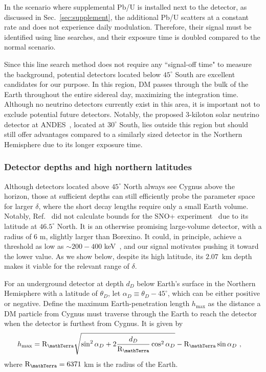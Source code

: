 \documentclass[aps,prd,amsmath,amssymb,10pt,letterpaper,balancelastpage,showpacs,superscriptaddress,nofootinbib,floatfix,notitlepage,longbibliography,twocolumn
]{revtex4-2}
\newcommand{\REarth}{\mathrm{R}_{\mathTerra}}
\newcommand{\hmax}{h_{\text{max}}}
\begin{document}
In the scenario where supplemental Pb/U is installed next to the detector, as discussed in Sec.~\ref{sec:supplement}, the additional Pb/U scatters at a constant rate and does not experience daily modulation. Therefore, their signal must be identified using line searches, and their exposure time is doubled compared to the normal scenario.

Since this line search method does not require any ``signal-off time" to measure the background, potential detectors located below $45^{\circ}$ South are excellent candidates for our purpose. In this region, DM passes through the bulk of the Earth throughout the entire sidereal day, maximizing the integration time. Although no neutrino detectors currently exist in this area, it is important not to exclude potential future detectors. Notably, the proposed 3-kiloton solar neutrino detector at ANDES~\cite{ANDES_neutrino, ANDES}, located at $30^\circ$ South, lies outside this region but should still offer advantages compared to a similarly sized detector in the Northern Hemisphere due to its longer exposure time.

\subsubsection{Detector depths and high northern latitudes}
Although detectors located above $45^\circ$ North always see Cygnus above the horizon, those at sufficient depths can still efficiently probe the parameter space for larger $\delta$, where the short decay lengths require only a small Earth volume. Notably, Ref.~\cite{Luminous} did not calculate bounds for the SNO+ experiment~\cite{SNO+} due to its latitude at $46.5^\circ$ North. It is an otherwise promising large-volume detector, with a radius of $6$ m, slightly larger than Borexino. It could, in principle, achieve a threshold as low as $\sim 200 - 400$ keV~\cite{SNO+Threshold}, and our signal motivates pushing it toward the lower value. As we show below, despite its high latitude, its $2.07$~km depth makes it viable for the relevant range of $\delta$.

For an underground detector at depth $d_D$ below Earth's surface in the Northern Hemisphere with a latitude of $\theta_{D}$, let $\alpha_D \equiv \theta_D-45^\circ$, which can be either positive or negative. Define the maximum Earth-penetration length $\hmax$ as the distance a DM particle from Cygnus must traverse through the Earth to reach the detector when the detector is furthest from Cygnus. It is given by
\begin{align} \label{eq: hmax}
    \hmax &= \REarth \sqrt{ \sin^2\alpha_D + 2 \frac{d_D}{\REarth} \cos^2 \alpha_D } - \REarth \sin\alpha_D ~,
\end{align}
where $\REarth=6371$ km is the radius of the Earth.
\end{document}
